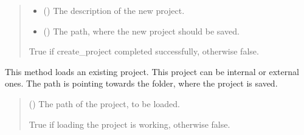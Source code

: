 \documentclass[letterpaper,10pt,english]{sphinxmanual}
\begin{document}
\begin{fulllineitems}
\begin{fulllineitems}
\begin{quote}
\begin{description}
\begin{itemize}
\item {} 
\sphinxAtStartPar
{} () \textendash{} The description of the new project.

\item {} 
\sphinxAtStartPar
{} () \textendash{} The path, where the new project should be saved.

\end{itemize}

\sphinxAtStartPar
True if create\_project completed successfully, otherwise false.

\sphinxAtStartPar
{}

\end{description}\end{quote}

\end{fulllineitems}


\begin{fulllineitems}
\label{\detokenize{apidoc/src.osm_configurator.model.application:src.osm_configurator.model.application.application.Application.load_project}}
\pysigstartsignatures
{}
\pysigstopsignatures
\sphinxAtStartPar
This method loads an existing project. This project can be internal or external ones. The path is pointing
towards the folder, where the project is saved.
\begin{quote}\begin{description}
\sphinxAtStartPar
{} () \textendash{} The path of the project, to be loaded.

\sphinxAtStartPar
True if loading the project is working, otherwise false.


\end{description}
\end{quote}
\end{fulllineitems}
\end{fulllineitems}
\end{document}
